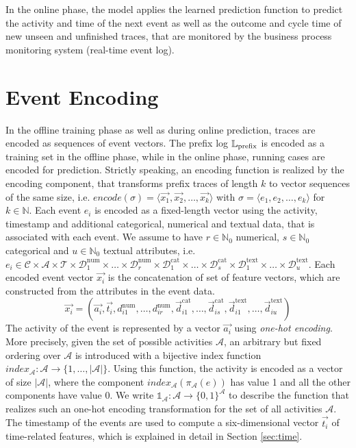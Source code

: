 In the online phase, the model applies the learned prediction function to predict the activity and time of the next event as well as the outcome and cycle time of new unseen and unfinished traces, that are monitored by the business process monitoring system (real-time event log).

\section{Event Encoding}\label{sec:event}

In the offline training phase as well as during online prediction, traces are encoded as sequences of event vectors.
The prefix log $\mathbb{L}_\mathrm{prefix}$ is encoded as a training set in the offline phase, while in the online phase, running cases are encoded for prediction.
Strictly speaking, an encoding function is realized by the encoding component, that transforms prefix traces of length $k$ to vector sequences of the same size, i.e. $encode(\sigma) = \langle \vec{x_1}, \vec{x_2}, \dots, \vec{x_k}\rangle$ with $\sigma = \langle e_1, e_2, \dots, e_k\rangle$ for $k \in \mathbb{N}$.
Each event $e_i$ is encoded as a fixed-length vector using the activity, timestamp and additional categorical, numerical and textual data, that is associated with each event.
We assume to have $r \in \mathbb{N}_0$ numerical, $s \in \mathbb{N}_0$ categorical and $u \in \mathbb{N}_0$ textual attributes, i.e. $e_i \in \mathcal{C} \times \mathcal{A}  \times \mathcal{T} \times \mathcal{D}_1^\mathrm{num} \times \dots \times \mathcal{D}_r^\mathrm{num}   \times \mathcal{D}_1^\mathrm{cat}  \times  \dots  \times \mathcal{D}_s^\mathrm{cat}   \times \mathcal{D}_1^\mathrm{text}   \times \dots  \times \mathcal{D}_u^\mathrm{text}$.
Each encoded event vector $\vec{x_i}$ is the concatenation of set of feature vectors, which are constructed from the attributes in the event data.
\begin{equation*}
\vec{x_i}=(
\vec{a_i},
\vec{t_i},
d_{i1}^\mathrm{num}, \dots, d_{ir}^\mathrm{num},
\vec{d}_{i1}^\mathrm{cat}, \dots,\vec{d}_{is}^\mathrm{cat},
\vec{d}_{i1}^\mathrm{text}, \dots, \vec{d}_{iu}^\mathrm{text})
\end{equation*}
The activity of the event is represented by a vector $\vec{a_i}$ using \textit{one-hot encoding}.
More precisely, given the set of possible activities $\mathcal{A}$, an arbitrary but fixed ordering over $\mathcal{A}$ is introduced with a bijective index function $index_\mathcal{A} \colon \mathcal{A} \to \{1, \dots, |\mathcal{A}|\}$.
Using this function, the activity is encoded as a vector of size $|\mathcal{A}|$, where the component $index_\mathcal{A}(\pi_\mathcal{A}(e))$ has value 1 and all the other components have value 0.
We write $\mathds{1}_\mathcal{A}\colon \mathcal{A} \to \{0,1\}^\mathcal{A}$ to describe the function that realizes such an one-hot encoding transformation for the set of all activities $\mathcal{A}$.
The timestamp of the events are used to compute a six-dimensional vector $\vec{t_i}$ of time-related features, which is explained in detail in Section \ref*{sec:time}.

